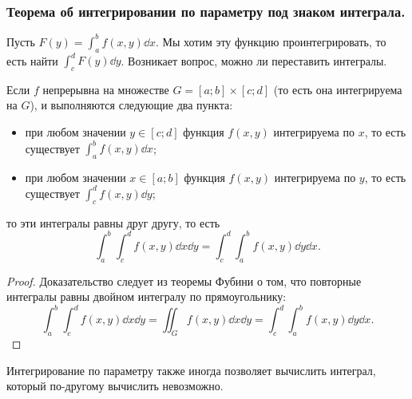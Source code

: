 \subsubsection{Теорема об интегрировании по параметру под знаком интеграла.}

Пусть $F(y) = \int_a^b f(x, y) \dd x$. Мы хотим эту функцию проинтегрировать, то есть найти $\int_c^d F(y) \dd y$. Возникает вопрос, можно ли переставить интегралы.

\begin{theorem*}
    Если $f$ непрерывна на множестве $G = [a; b] \times [c; d]$ (то есть она интегрируема на $G$), и выполняются следующие два пункта:
    \begin{itemize}
    \item 
        при любом значении $y \in [c; d]$ функция $f(x, y)$ интегрируема по $x$, то есть существует $\int_a^b f(x, y) \dd x$;

    \item 
        при любом значении $x \in [a; b]$ функция $f(x, y)$ интегрируема по $y$, то есть существует $\int_c^d f(x, y) \dd y$;
    \end{itemize}

    то эти интегралы равны друг другу, то есть
    \begin{equation*}
        \int_a^b \int_c^d f(x, y) \dd x \dd y
        = \int_c^d \int_a^b f(x, y) \dd y \dd x.
    \end{equation*}
\end{theorem*}

\begin{proof}
    Доказательство следует из теоремы Фубини о том, что повторные интегралы равны двойном интегралу по прямоугольнику:
    \begin{equation*}
        \int_a^b \int_c^d f(x, y) \dd x \dd y
        = \iint_G f(x, y) \dd x \dd y
        = \int_c^d \int_a^b f(x, y) \dd y \dd x.
    \end{equation*}
\end{proof}

Интегрирование по параметру также иногда позволяет вычислить интеграл, который по-другому вычислить невозможно.
